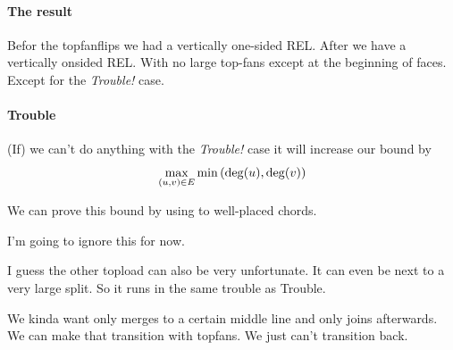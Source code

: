 \paragraph{The result}
Befor the topfanflips we had a vertically one-sided REL. After we have a vertically onsided REL. With no large top-fans except at the beginning of faces. Except for the \emph{Trouble!} case.


\paragraph{Trouble}
(If) we can't do anything with the \emph{Trouble!} case  it will increase our bound by $$\max_{(u,v) \in E}   \min\left( { \deg(u), \deg(v) } \right)$$

We can prove this bound by using  to well-placed chords. 

I'm going to ignore this for now.

I guess the other topload can also be very unfortunate. It can even be next to a very large split. So it runs in the same trouble as Trouble.

We kinda want only merges to a certain middle line and only joins afterwards. We can make that transition with topfans. We just can't transition back.
